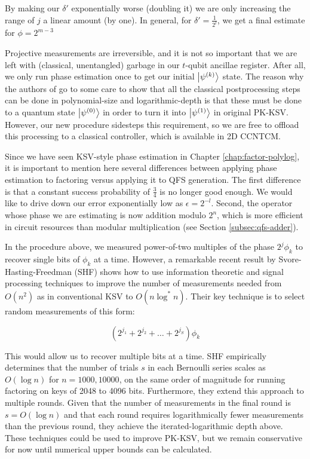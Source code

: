 By making our $\delta'$
exponentially worse (doubling it) we are only increasing the range of
$j$ a linear amount (by one). In general, for $\delta'=\frac{1}{2^l}$, we get
a final estimate for $\phi = 2^{m-3}$

Projective measurements are irreversible, and it is not so important that
we are left with (classical, unentangled) garbage in our $t$-qubit ancillae register.
After all, we only run phase estimation once
to get our initial $\left\vert{\psi^{(k)}}\right\rangle$ state.
The reason why
the authors of \cite{Kitaev2002} go to some care to show that all the classical
postprocessing steps can be done in polynomial-size and logarithmic-depth
is that these must be done to a quantum state $\left\vert{\psi^{(0)}}\right\rangle$ in order
to turn it into $\left\vert{\psi^{(1)}}\right\rangle$ in original PK-KSV. However, our new procedure
sidesteps this requirement, so we are free to offload this processing to a
classical controller, which is available in \textsf{2D CCNTCM}.

Since we have seen KSV-style phase estimation in
Chapter \ref{chap:factor-polylog}, it is important to mention here several
differences between applying phase estimation to factoring versus
applying it to QFS generation. The first difference is that a constant
success probability of $\frac{3}{4}$ is no longer good enough. We would
like to drive down our error exponentially low as $\epsilon = 2^{-l}$.
Second, the operator whose phase we are estimating is now
addition modulo $2^n$, which is more efficient in circuit resources
than modular multiplication (see Section \ref{subsec:qfs-adder}).

In the procedure above, we measured power-of-two multiples of the phase
$2^{j}\phi_k$ to recover single bits of $\phi_k$ at a time.
However, a remarkable recent result by Svore-Hasting-Freedman (SHF) shows
how to use information theoretic and signal processing techniques to
improve the number of measurements needed from $O(n^2)$ as in conventional
KSV to $O(n\log^{*}n)$.
Their key technique is to select random measurements of this form:

\begin{equation}
(2^{j_1}+2^{j_2}+\ldots + 2^{j_S})\phi_k
\end{equation}

This would allow us to recover multiple bits at a time.
SHF empirically determines that the number of trials $s$ in
each Bernoulli series scales as $O(\log n)$ for $n = {1000,10000}$,
on the same order of magnitude for running factoring on
keys of 2048 to 4096 bits.
Furthermore, they extend this approach to multiple rounds. Given
that the number of measurements in the final round is
$s = O(\log n)$ and that each round requires logarithmically
fewer measurements than the previous round, they
achieve the iterated-logarithmic depth above.
These techniques could be used to improve PK-KSV, but we
remain conservative for now until numerical upper bounds can be
calculated.

